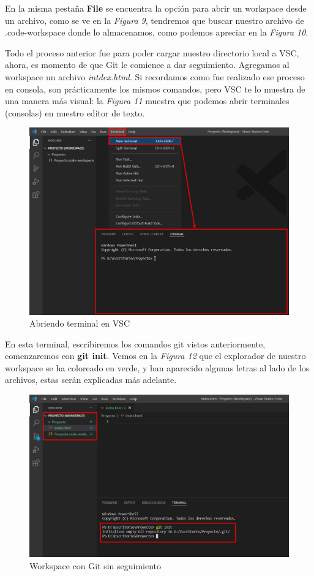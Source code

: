 En la misma pestaña \textbf{File} se encuentra la opción para abrir un workspace desde un archivo, como se ve en la \textit{Figura 9}, tendremos que buscar nuestro archivo de .code-workspace donde lo almacenamos, como podemos apreciar en la \textit{Figura 10}.

Todo el proceso anterior fue para poder cargar nuestro directorio local a VSC, ahora, es momento de que Git le comience a dar seguimiento. Agregamos al workspace un archivo \textit{intdex.html}. Si recordamos como fue realizado ese proceso en consola, son prácticamente los mismos comandos, pero VSC te lo muestra de una manera más visual: la \textit{Figura 11} muestra que podemos abrir terminales (consolas) en nuestro editor de texto.
\begin{figure}[H]
    \begin{center}
        \caption{Abriendo terminal en VSC}
        \label{fig: 11}
        \includegraphics[width=12cm]{capturas/abriendo_terminal.png}
    \end{center}
\end{figure}

En esta terminal, escribiremos los comandos git vistos anteriormente, comenzaremos con \textbf{git init}. Vemos en la \textit{Figura 12} que el explorador de nuestro workspace se ha coloreado en verde, y han aparecido algunas letras al lado de los archivos, estas serán explicadas más adelante.
\begin{figure}[H]
    \begin{center}
        \caption{Workspace con Git sin seguimiento}
        \label{fig: 12}
        \includegraphics[width=12cm]{capturas/git init.png}
    \end{center}
\end{figure}

